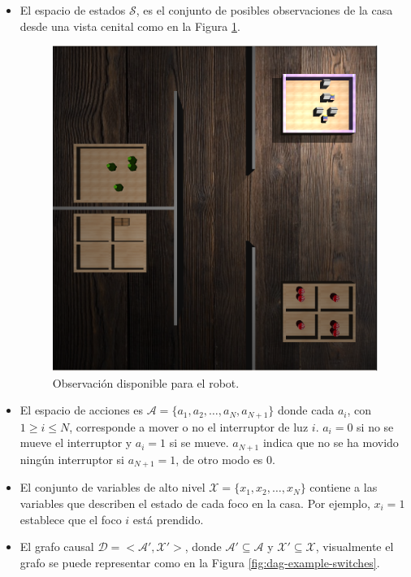  \begin{itemize}
     \item El espacio de estados $\mathcal{S}$, es el conjunto de
     posibles observaciones de la casa desde una vista cenital como en la Figura
   \ref{fig:obs-switches}.
     \begin{figure}[H]
         \centering
         \includegraphics[scale=0.17]{Chapter4/Figs/example_obs.png}
         \caption{Observación disponible para el robot.}
         \label{fig:obs-switches}
     \end{figure}
     \item El espacio de acciones es $\mathcal{A} = \{a_1, a_2, \dots, a_N, a_{N+1}\}$
     donde cada $a_i$, con $1 \geq i \leq N$, corresponde a mover o no el interruptor de luz $i$. $a_i = 0$ si no se mueve el interruptor y $a_i = 1$ si se mueve. $a_{N+1}$ indica que no se ha movido ningún interruptor si $a_{N+1} = 1$, de otro modo es $0$.
     \item El conjunto de variables de alto nivel $\mathcal{X} = \{x_1, x_2, \dots, x_N\}$ contiene
     a las variables que describen el estado de cada foco en la casa. Por ejemplo, $x_i = 1$ establece que el foco $i$ está prendido.
     \item El grafo causal $\mathcal{D} = <\mathcal{A'}, \mathcal{X'}>$, donde
     $\mathcal{A'} \subseteq \mathcal{A}$ y $\mathcal{X'} \subseteq \mathcal{X}$, visualmente el grafo se puede representar como en la Figura \ref{fig:dag-example-switches}.
     

\end{itemize}
